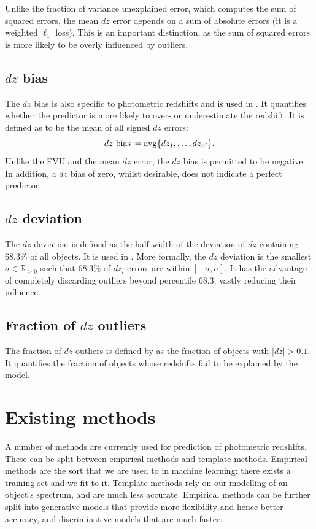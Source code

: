 \documentclass[11pt,twoside,openright]{report}
\newcommand\bbR{\mathbb{R}}
\newcommand\abs[1]{\left|#1\right|}
\DeclareMathOperator{\avg}{avg}
\begin{document}
Unlike the fraction of variance unexplained error, which computes the sum of squared errors, the mean $dz$ error depends on a sum of absolute errors (it is a weighted $\ell_1$ loss). This is an important distinction, as the sum of squared errors is more likely to be overly influenced by outliers.

\subsection{$dz$ bias}
\label{sec:dz_bias}

The $dz$ bias is also specific to photometric redshifts and is used in \citep{Chris}. It quantifies whether the predictor is more likely to over- or underestimate the redshift. It is defined as to be the mean of all signed $dz$ errors:\[
  \textrm{$dz$ bias} \coloneqq \avg\{ dz_1, \dots, dz_{n'} \} \text.
\] Unlike the FVU and the mean $dz$ error, the $dz$ bias is permitted to be negative. In addition, a $dz$ bias of zero, whilst desirable, does not indicate a perfect predictor.

\subsection{$dz$ deviation}
\label{sec:dz_deviation}

The $dz$ deviation is defined as the half-width of the deviation of $dz$ containing $68.3\%$ of all objects. It is used in \citep{Chris}. More formally, the $dz$ deviation is the smallest $\sigma \in \bbR_{\geq0}$ such that $68.3\%$ of $dz_i$ errors are within $[-\sigma, \sigma]$. It has the advantage of completely discarding outliers beyond percentile $68.3$, vastly reducing their influence.

\subsection{Fraction of $dz$ outliers}
\label{sec:fraction_dz_outliers}

The fraction of $dz$ outliers is defined by \citep{Chris} as the fraction of objects with $\abs{dz} > 0.1$. It quantifies the fraction of objects whose redshifts fail to be explained by the model.

\section{Existing methods}
\label{sec:existing-methods}

A number of methods are currently used for prediction of photometric redshifts. These can be split between empirical methods and template methods. Empirical methods are the sort that we are used to in machine learning: there exists a training set and we fit to it. Template methods rely on our modelling of an object's spectrum, and are much less accurate. Empirical methods can be further split into generative models that provide more flexibility and hence better accuracy, and discriminative models that are much faster.
\end{document}
